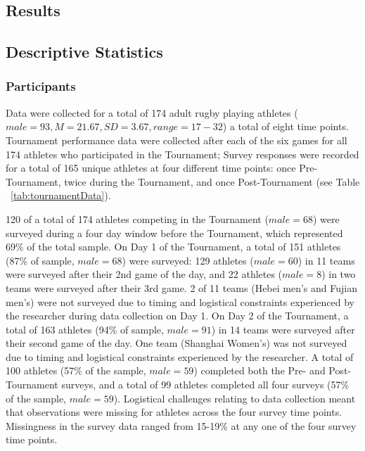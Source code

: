 \begin{CJK}{UTF8}{gbsn}
\clearpage

\section{Results}



\subsection{Descriptive Statistics}

  \subsubsection{Participants}

Data were collected for a total of 174 adult rugby playing athletes ($male = 93, M = 21.67, SD = 3.67, range = 17-32$) a total of eight time points. Tournament performance data were collected after each of the six games for all 174 athletes who participated in the Tournament;  Survey responses were recorded for a total of 165 unique athletes at four different time points: once Pre-Tournament, twice during the Tournament, and once Post-Tournament (see Table ~\ref{tab:tournamentData}).



120 of a total of 174 athletes competing in the Tournament ($male = 68$) were surveyed during a four day window before the Tournament, which represented 69\% of the total sample.  On Day 1 of the Tournament, a total of 151 athletes (87\% of sample, $male = 68$) were surveyed: 129 athletes ($male = 60$) in 11 teams were surveyed after their 2nd game of the day, and 22 athletes ($male = 8$) in two teams were surveyed after their 3rd game. 2 of 11 teams (Hebei men’s and Fujian men’s) were not surveyed due to timing and logistical constraints experienced by the researcher during data collection on Day 1. On Day 2 of the Tournament, a total of 163 athletes (94\% of sample, $male = 91$) in 14 teams were surveyed after their second game of the day. One team (Shanghai Women’s) was not surveyed due to timing and logistical constraints experienced by the researcher. A total of 100 athletes (57\% of the sample, $male = 59$) completed both the Pre- and Post-Tournament surveys, and a total of 99 athletes completed all four surveys (57\% of the sample, $male = 59$). Logistical challenges relating to data collection meant that observations were missing for athletes across the four survey time points. Missingness in the survey data ranged from 15-19\% at any one of the four survey time points.\\



\end{CJK}
